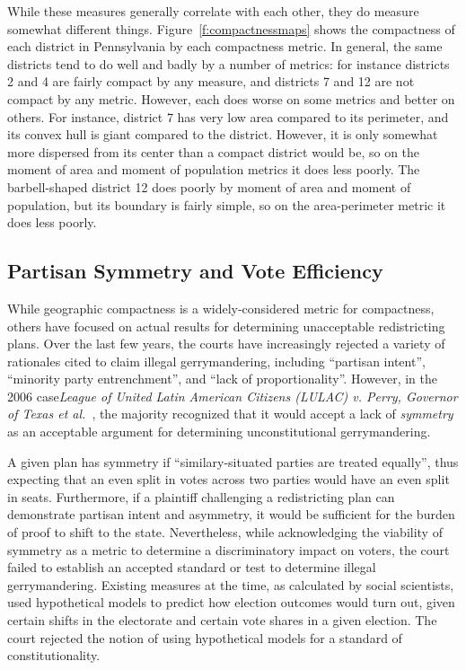 \documentclass[12pt]{article}
\begin{document}
  While these measures generally correlate with each other, they do measure somewhat different things.  Figure~\ref{f:compactnessmaps} shows the compactness of each district in Pennsylvania by each compactness metric.  In general, the same districts tend to do well and badly by a number of metrics: for instance districts 2 and 4 are fairly compact by any measure, and districts 7 and 12 are not compact by any metric.  However, each does worse on some metrics and better on others.  For instance, district 7 has very low area compared to its perimeter, and its convex hull is giant compared to the district.  However, it is only somewhat more dispersed from its center than a compact district would be, so on the moment of area and moment of population metrics it does less poorly.  The barbell-shaped district 12 does poorly by moment of area and moment of population, but its boundary is fairly simple, so on the area-perimeter metric it does less poorly.

  \subsection{Partisan Symmetry and Vote Efficiency}
  While geographic compactness is a widely-considered metric for compactness, others have focused on actual results for determining unacceptable redistricting plans.  Over the last few years, the courts have increasingly rejected a variety of rationales cited to claim illegal gerrymandering, including ``partisan intent'',  ``minority party entrenchment'', and ``lack of proportionality''.  However, in the 2006 case\emph{League of United Latin American Citizens (LULAC) v. Perry, Governor of Texas et al.}~\cite{LULAC}, the majority recognized that it would accept a lack of \emph{symmetry} as an acceptable argument for determining unconstitutional gerrymandering.

  A given plan has symmetry if ``similary-situated parties are treated equally'', thus expecting that an even split in votes across two parties would have an even split in seats. Furthermore, if a plaintiff challenging a redistricting plan can demonstrate partisan intent and asymmetry, it would be sufficient for the burden of proof to shift to the state.  Nevertheless, while acknowledging the viability of symmetry as a metric to determine a discriminatory impact on voters, the court failed to establish an accepted standard or test to determine illegal gerrymandering.  Existing measures at the time, as calculated by social scientists, used hypothetical models to predict how election outcomes would turn out, given certain shifts in the electorate and certain vote shares in a given election. The court rejected the notion of using hypothetical models for a standard of constitutionality.~\cite{LULAC}
\end{document}

